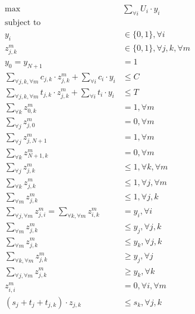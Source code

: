 \begin{align}
	\label{eq:max}
	\max \quad & \sum_{\forall i} U_{{i}} \cdot y_{i} \\
	\text{subject to } \quad & \nonumber \\
	\label{eq:y}
	y_{i} & \in \{ 0, 1 \}, \forall i \\
	\label{eq:z}
	z^m_{j,k} & \in \{ 0, 1 \}, \forall j,k, \forall m \\
	\label{eq:sd}
	y_{0} = y_{{N+1}} & = 1 \\
	\label{eq:cost}
	\sum_{\forall j, k, \forall m} c_{{j},{k}} \cdot z^m_{j,k} + \sum_{\forall i} c_{i} \cdot y_{i} & \leq C \\
	\label{eq:time}
	\sum_{\forall j, k, \forall m} t_{{j},{k}} \cdot z^m_{j,k} + \sum_{\forall i} t_{i} \cdot y_{i} & \leq T \\
	\label{eq:sout}
	\sum_{\forall k} z^m_{{0},{k}} & = 1, \forall m \\
	\label{eq:sin}
	\sum_{\forall j} z^m_{{j},{0}} & = 0, \forall m \\
	\label{eq:din}
	\sum_{\forall j} z^m_{{j},{N+1}} & = 1, \forall m \\
	\label{eq:dout}
	\sum_{\forall k} z^m_{{N+1},{k}} & = 0, \forall m \\
	\label{eq:out}
	\sum_{\forall j} z^m_{{j},{k}} & \leq 1, \forall k, \forall m \\
	\label{eq:in}
	\sum_{\forall k} z^m_{{j},{k}} & \leq 1, \forall j, \forall m \\
	\label{eq:mode}
	\sum_{\forall m} z^m_{{j},{k}} & \leq 1, \forall j, k \\
	\label{eq:connectivity}
	\sum_{\forall j, \forall m} z^m_{{j},{i}} = \sum_{\forall k, \forall m} z^m_{{i},{k}} & = y_i, \forall i \\
	\label{eq:nodechosen1}
	\sum_{\forall m} z^m_{{j},{k}} & \leq y_j, \forall j,k \\
	\label{eq:nodechosen2}
	\sum_{\forall m} z^m_{{j},{k}} & \leq y_k, \forall j,k \\
	\label{eq:edgechosen1}
	\sum_{\forall k, \forall m} z^m_{{j},{k}} & \geq y_j, \forall j \\
	\label{eq:edgechosen2}
    \sum_{\forall j, \forall m} z^m_{{j},{k}} & \geq y_k, \forall k \\
	\label{eq:self}
	z^m_{{i},{i}} & = 0, \forall i, \forall m  \\
	\label{eq:subtour}
	(s_j + t_{j} + t_{j,k}) \cdot z_{j,k} & \leq s_k, \forall j,k
\end{align}

